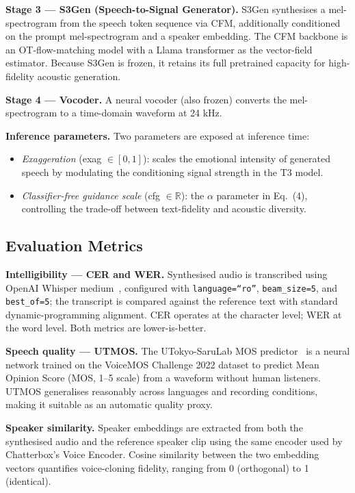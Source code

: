 \documentclass[conference]{IEEEtran}
\begin{document}
\textbf{Stage 3 — S3Gen (Speech-to-Signal Generator).}
S3Gen synthesises a mel-spectrogram from the speech token sequence
via CFM, additionally conditioned on the prompt mel-spectrogram and
a speaker embedding.
The CFM backbone is an OT-flow-matching model with a Llama
transformer as the vector-field estimator.
Because S3Gen is frozen, it retains its full pretrained capacity for
high-fidelity acoustic generation.

\textbf{Stage 4 — Vocoder.}
A neural vocoder (also frozen) converts the mel-spectrogram to a
time-domain waveform at 24 kHz.

\textbf{Inference parameters.}
Two parameters are exposed at inference time:
\begin{itemize}
  \item \emph{Exaggeration} (exag $\in [0,1]$): scales the emotional
    intensity of generated speech by modulating the conditioning
    signal strength in the T3 model.
  \item \emph{Classifier-free guidance scale} (cfg $\in \mathbb{R}$):
    the $\alpha$ parameter in Eq.~(4), controlling the trade-off
    between text-fidelity and acoustic diversity.
\end{itemize}

\subsection{Evaluation Metrics}

\textbf{Intelligibility — CER and WER.}
Synthesised audio is transcribed using OpenAI Whisper
medium~\cite{whisper}, configured with \texttt{language=``ro''},
\texttt{beam\_size=5}, and \texttt{best\_of=5}; the transcript is
compared against the reference text with standard
dynamic-programming alignment.
CER operates at the character level; WER at the word level.
Both metrics are lower-is-better.

\textbf{Speech quality — UTMOS.}
The UTokyo-SaruLab MOS predictor~\cite{utmos} is a neural network
trained on the VoiceMOS Challenge 2022 dataset to predict Mean
Opinion Score (MOS, 1--5 scale) from a waveform without human
listeners.
UTMOS generalises reasonably across languages and recording
conditions, making it suitable as an automatic quality proxy.

\textbf{Speaker similarity.}
Speaker embeddings are extracted from both the synthesised audio
and the reference speaker clip using the same encoder used by
Chatterbox's Voice Encoder.
Cosine similarity between the two embedding vectors quantifies
voice-cloning fidelity, ranging from 0 (orthogonal) to 1 (identical).
\end{document}
